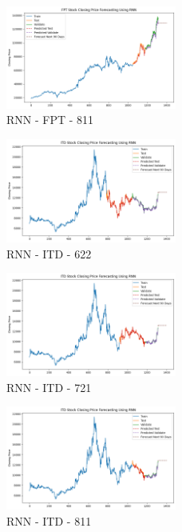 \documentclass{ieeeojies}
\begin{document}
\begin{figure} [H]
    \centering
    \includegraphics[width=0.5\textwidth]{bibliography/Figure/RNN_FPT_811_90.png}
    \caption{RNN - FPT - 811}
    \label{fig:RNN_FPT_811_90}
\end{figure}
\begin{figure} [H]
    \centering
    \includegraphics[width=0.5\textwidth]{bibliography/Figure/RNN_ITD_622_90.png}
    \caption{RNN - ITD - 622}
    \label{fig:RNN_ITD_622_90}
\end{figure}
\begin{figure} [H]
    \centering
    \includegraphics[width=0.5\textwidth]{bibliography/Figure/RNN_ITD_721_90.png}
    \caption{RNN - ITD - 721}
    \label{fig:RNN_ITD_721_90}
\end{figure}
\begin{figure} [H]
    \centering
    \includegraphics[width=0.5\textwidth]{bibliography/Figure/RNN_ITD_811_90.png}
    \caption{RNN - ITD - 811}
    \label{fig:RNN_ITD_811_90}
\end{figure}
\end{document}
